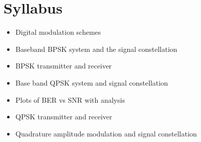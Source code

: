 \documentclass[../course]{subfiles}
\begin{document}
\section{Syllabus}

\begin{itemize}

    \item Digital modulation schemes
    \item Baseband BPSK system and the signal constellation
    \item BPSK transmitter and receiver
    \item Base band QPSK system and signal constellation
    \item Plots of BER vs SNR with analysis
    \item QPSK transmitter and receiver
    \item Quadrature amplitude modulation and signal constellation

\end{itemize}
\end{document}
